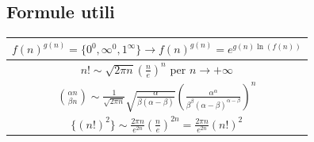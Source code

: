 \documentclass[10pt, a4paper]{article}
\begin{document}
    \subsection{Formule utili}
        \begin{center}
            \begin{tabular}{|c|}
                \hline
                $f(n)^{g(n)}=\{0^0, \infty^0, 1^\infty\}\to f(n)^{g(n)}=e^{g(n)\ln\left(f(n)\right)}$ \\
                \hline
                $\displaystyle n! \sim \sqrt{2\pi n}\left(\frac{n}{e}\right)^n$ per $n \to +\infty$ \\
                \hline
                $\displaystyle\binom{\alpha n}{\beta n}\sim \frac{1}{\sqrt{2\pi n}}\sqrt{\frac{\alpha}{\beta(\alpha-\beta)}}\left(\frac{\alpha^\alpha}{\beta^\beta(\alpha-\beta)^{\alpha-\beta}}\right)^n$\\
                \hline
                $\displaystyle\{(n!)^2\} \sim \frac{2\pi n}{e^{2n}}\left(\frac{n}{e}\right)^{2n} = \frac{2\pi n}{e^{2n}}(n!)^2$\\
                \hline
            \end{tabular}
        \end{center}
\end{document}
